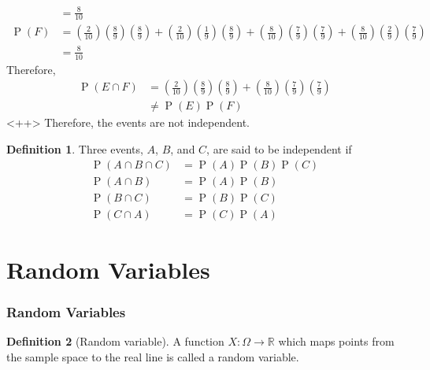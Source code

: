 \documentclass[titlepage, fleqn, a4paper, 12pt, twoside]{article}
\theoremstyle{definition}
\newtheorem{definition}{Definition}
\theoremstyle{theorem}
\DeclareMathOperator{\prob}{\mathrm{P}}
\begin{document}
\begin{solution}
\begin{align*}
                         & = \frac{8}{10}                                                                                                                                                                                                                                                                                                                                  \\
		\prob(F) & = \left( \frac{2}{10} \right) \left( \frac{8}{9} \right) \left( \frac{8}{9} \right) + \left( \frac{2}{10} \right) \left( \frac{1}{9} \right) \left( \frac{8}{9} \right) + \left( \frac{8}{10} \right) \left( \frac{7}{9} \right) \left( \frac{7}{9} \right) + \left( \frac{8}{10} \right) \left( \frac{2}{9} \right) \left( \frac{7}{9} \right) \\
                         & = \frac{8}{10}
	\end{align*}
	Therefore,
	\begin{align*}
		\prob(E \cap F) & = \left( \frac{2}{10} \right) \left( \frac{8}{9} \right) \left( \frac{8}{9} \right) + \left( \frac{8}{10} \right) \left( \frac{7}{9} \right) \left( \frac{7}{9} \right) \\
                                & \neq \prob(E) \prob(F)
	\end{align*}<++>
	Therefore, the events are not independent.
\end{solution}

\begin{definition}
	Three events, $A$, $B$, and $C$, are said to be independent if
	\begin{align*}
		\prob(A \cap B \cap C) & = \prob(A) \prob(B) \prob(C) \\
		\prob(A \cap B)        & = \prob(A) \prob(B)          \\
		\prob(B \cap C)        & = \prob(B) \prob(C)          \\
		\prob(C \cap A)        & = \prob(C) \prob(A)
	\end{align*}
\end{definition}

\clearpage
\part{Random Variables}

\section{Random Variables}

\begin{definition}[Random variable]
	A function $X : \Omega \to \mathbb{R}$ which maps points from the sample space to the real line is called a random variable.
\end{definition}
\end{document}
